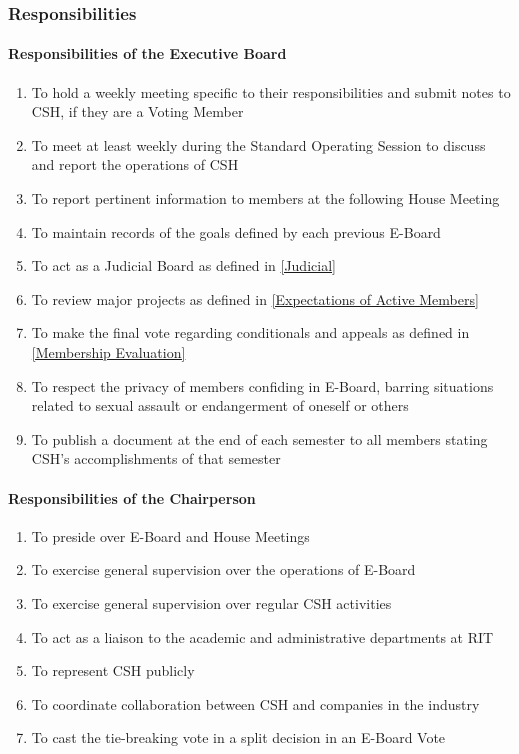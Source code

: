 \documentclass{article}
\newcommand{\asubsection}[1]{\subsubsection{#1} \label{#1}}
\newcommand{\asubsubsection}[1]{\paragraph{#1} \label{#1}}
\begin{document}
\asubsection{Responsibilities}
\renewcommand{\theenumi}{\alph{enumi}} %

\asubsubsection{Responsibilities of the Executive Board}
\renewcommand{\theenumi}{\arabic{enumi}} %
\begin{enumerate}
	\item To hold a weekly meeting specific to their responsibilities and submit notes to CSH, if they are a Voting Member
	\item To meet at least weekly during the Standard Operating Session to discuss and report the operations of CSH
	\item To report pertinent information to members at the following House Meeting
	\item To maintain records of the goals defined by each previous E-Board
	\item To act as a Judicial Board as defined in \ref{Judicial}
	\item To review major projects as defined in \ref{Expectations of Active Members}
	\item To make the final vote regarding conditionals and appeals as defined in \ref{Membership Evaluation}
	\item To respect the privacy of members confiding in E-Board, barring situations related to sexual assault or endangerment of oneself or others
	\item To publish a document at the end of each semester to all members stating CSH's accomplishments of that semester
\end{enumerate}

\asubsubsection{Responsibilities of the Chairperson}
\begin{enumerate}
	\item To preside over E-Board and House Meetings
	\item To exercise general supervision over the operations of E-Board
	\item To exercise general supervision over regular CSH activities
	\item To act as a liaison to the academic and administrative departments at RIT
	\item To represent CSH publicly
	\item To coordinate collaboration between CSH and companies in the industry
	\item To cast the tie-breaking vote in a split decision in an E-Board Vote
\end{enumerate}
\end{document}
